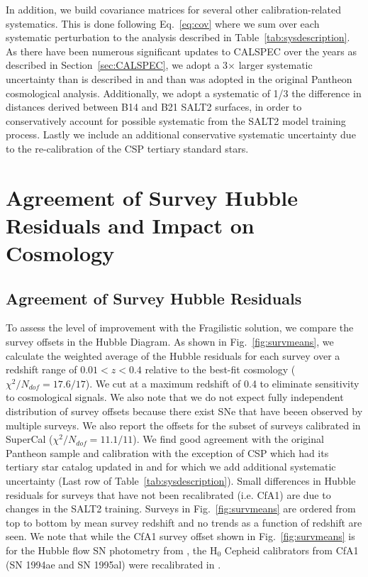 \documentclass[twocolumn]{aastex63}
\newcommand{\blue}{\color{black}}
\begin{document}
{\blue In addition, we build covariance matrices for several other calibration-related systematics. This is done following Eq.~\ref{eq:cov} where we sum over each systematic perturbation to the analysis described in Table~\ref{tab:sysdescription}. As there have been numerous significant updates to CALSPEC over the years as described in Section~\ref{sec:CALSPEC}, we adopt a 3$\times$ larger systematic uncertainty than is described in \cite{Bohlin21} and than was adopted in the original Pantheon cosmological analysis. Additionally, we adopt a systematic of 1/3 the difference in distances derived between B14 and B21 SALT2 surfaces, in order to conservatively account for possible systematic from the SALT2 model training process. Lastly we include an additional conservative systematic uncertainty due to the re-calibration of the CSP tertiary standard stars.}




\section{Agreement of Survey Hubble Residuals and Impact on Cosmology}
\label{sec:cosmology}


\subsection{Agreement of Survey Hubble Residuals}



To assess the level of improvement with the Fragilistic solution, we compare the survey offsets {\blue in the Hubble Diagram}. As shown in Fig.~\ref{fig:survmeans}, we calculate the weighted average of the Hubble residuals for each survey over a redshift range of $0.01<z<0.4$ relative to the best-fit cosmology ($\chi^2/N_{dof}=17.6/17$). We cut at a maximum redshift of 0.4 to eliminate sensitivity to cosmological signals. We also note that we do not expect fully independent distribution of survey offsets because there exist SNe that have beeen observed by multiple surveys. {\blue We also report the offsets for the subset of surveys calibrated in SuperCal ($\chi^2/N_{dof}=11.1/11$). We find good agreement with the original Pantheon sample and calibration with the exception of CSP which had its tertiary star catalog updated in \cite{krisciunas20} and for which we add additional systematic uncertainty (Last row of Table~\ref{tab:sysdescription}). Small differences in Hubble residuals for surveys that have not been recalibrated (i.e. CfA1) are due to changes in the SALT2 training. Surveys in Fig.~\ref{fig:survmeans} are ordered from top to bottom by mean survey redshift and no trends as a function of redshift are seen. We note that while the CfA1 survey offset shown in Fig.~\ref{fig:survmeans} is for the Hubble flow SN photometry from \cite{riess99}, the H$_0$ Cepheid calibrators from CfA1 (SN 1994ae and SN 1995al) were recalibrated in \cite{riess05,riess09}.}
\end{document}
